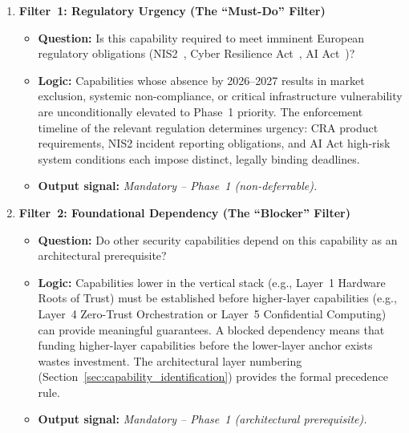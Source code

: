 \documentclass{ieeeaccess}
\begin{document}
\begin{enumerate}

    \item \textbf{Filter~1: Regulatory Urgency (The ``Must-Do'' Filter)}
    \begin{itemize}
        \item \textbf{Question:} Is this capability required to meet imminent
        European regulatory obligations (NIS2~\cite{nis2}, Cyber Resilience
        Act~\cite{cra}, AI Act~\cite{aiact})?
        \item \textbf{Logic:} Capabilities whose absence by 2026--2027 results
        in market exclusion, systemic non-compliance, or critical infrastructure
        vulnerability are unconditionally elevated to Phase~1 priority. The
        enforcement timeline of the relevant regulation determines urgency:
        CRA product requirements, NIS2 incident reporting obligations, and AI
        Act high-risk system conditions each impose distinct, legally binding
        deadlines.
        \item \textbf{Output signal:} \emph{Mandatory -- Phase~1 (non-deferrable).}
    \end{itemize}

    \item \textbf{Filter~2: Foundational Dependency (The ``Blocker'' Filter)}
    \begin{itemize}
        \item \textbf{Question:} Do other security capabilities depend on this
        capability as an architectural prerequisite?
        \item \textbf{Logic:} Capabilities lower in the vertical stack (e.g.,
        Layer~1 Hardware Roots of Trust) must be established before higher-layer
        capabilities (e.g., Layer~4 Zero-Trust Orchestration or Layer~5
        Confidential Computing) can provide meaningful guarantees. A blocked
        dependency means that funding higher-layer capabilities before the
        lower-layer anchor exists wastes investment. The architectural layer
        numbering (Section~\ref{sec:capability_identification}) provides the
        formal precedence rule.
        \item \textbf{Output signal:} \emph{Mandatory -- Phase~1 (architectural
        prerequisite).}
    \end{itemize}


\end{enumerate}
\end{document}
